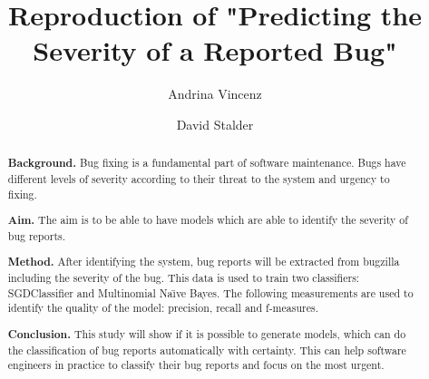 \documentclass[sigconf,screen]{acmart}
\begin{document}
\title{Reproduction of "Predicting the Severity of a Reported Bug"}

\author{Andrina Vincenz}

\author{David Stalder}


\renewcommand{\shortauthors}{Trovato, Tobin, B\'eranger}

\begin{abstract}

\textbf{Background.} Bug fixing is a fundamental part of software maintenance. Bugs have different levels of severity according to their threat to the system and urgency to fixing.

\textbf{Aim.} The aim is to be able to have models which are able to identify the severity of bug reports.

\textbf{Method.} After identifying the system, bug reports will be extracted from bugzilla including the severity of the bug. This data is used to train two classifiers: SGDClassifier and Multinomial Na{\"\i}ve Bayes. The following measurements are used to identify the quality of the model: precision, recall and f-measures.

\textbf{Conclusion.} This study will show if it is possible to generate models, which can do the classification of bug reports automatically with certainty. This can help software engineers in practice to classify their bug reports and focus on the most urgent.
\end{abstract}


\maketitle
\end{document}

